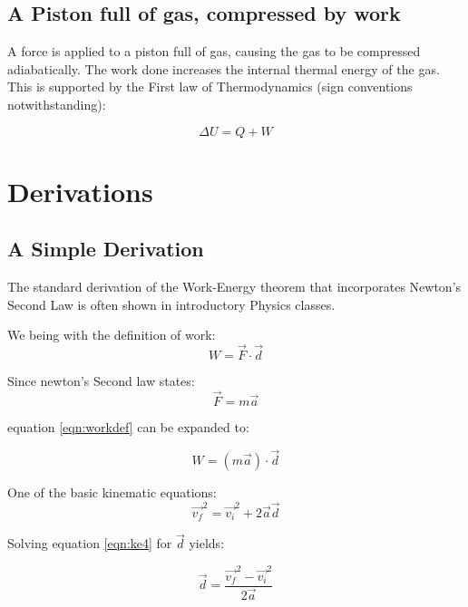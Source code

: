 \documentclass[letterpaper, 12pt]{article}
\begin{document}
\subsection{A Piston full of gas, compressed by work}

A force is applied to a piston full of gas, causing the gas to be compressed adiabatically.   The work done increases the internal thermal energy of the gas.  This is supported by the First law of Thermodynamics (sign conventions notwithstanding):

\begin{equation}
	\Delta U = Q + W
\end{equation}

\newpage


\section{Derivations}

\subsection{A Simple Derivation}

The standard derivation of the Work-Energy theorem that incorporates Newton's Second Law is often shown in introductory Physics classes.

We being with the definition of work:
\begin{equation}
	W = \vec{F}\cdot\vec{d}
	\label{eqn:workdef}
\end{equation}

Since newton's Second law states: 
\begin{equation}
	\vec{F} = m \vec{a}
\end{equation}

equation \ref{eqn:workdef} can be expanded to:

\begin{equation}
	W = (m\vec{a})\cdot\vec{d}
	\label{eqn:workexpand}
\end{equation}


One of the basic kinematic equations:
\begin{equation}
	 \overrightarrow{v_f}^2 = \overrightarrow{v_i}^2 + 2 \vec{a} \vec{d}
	\label{eqn:ke4}
\end{equation}

Solving equation \ref{eqn:ke4} for $\vec{d}$ yields:

\begin{equation}
	\vec{d} = \frac{\overrightarrow{v_f}^2 - \overrightarrow{v_i}^2}{2 \vec{a}}
		\label{eqn:ke4mod}
\end{equation}
\end{document}
